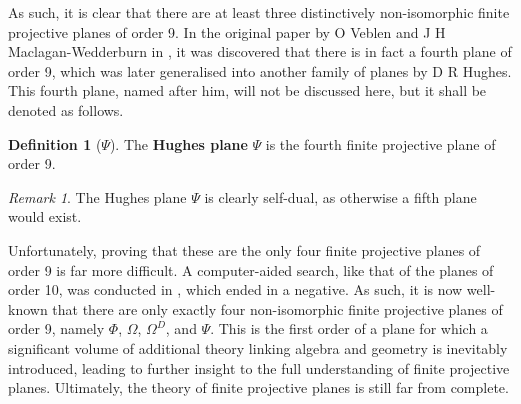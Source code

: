\documentclass{report}
\theoremstyle{definition}\newtheorem*{definition}{Definition}
\theoremstyle{definition}\newtheorem*{example}{Example}
\theoremstyle{remark}\newtheorem*{remark}{Remark}
\begin{document}
As such, it is clear that there are at least three distinctively non-isomorphic finite projective planes of order 9. In the original paper by O Veblen and J H Maclagan-Wedderburn in \cite{7}, it was discovered that there is in fact a fourth plane of order 9, which was later generalised into another family of planes by D R Hughes. This fourth plane, named after him, will not be discussed here, but it shall be denoted as follows.

\begin{definition}[$ \Psi $]
The \textbf{Hughes plane} $ \Psi $ is the fourth finite projective plane of order 9.
\end{definition}

\begin{remark}
The Hughes plane $ \Psi $ is clearly self-dual, as otherwise a fifth plane would exist.
\end{remark}

Unfortunately, proving that these are the only four finite projective planes of order 9 is far more difficult. A computer-aided search, like that of the planes of order 10, was conducted in \cite{computersearch}, which ended in a negative. As such, it is now well-known that there are only exactly four non-isomorphic finite projective planes of order 9, namely $ \Phi $, $ \Omega $, $ \Omega^D $, and $ \Psi $. This is the first order of a plane for which a significant volume of additional theory linking algebra and geometry is inevitably introduced, leading to further insight to the full understanding of finite projective planes. Ultimately, the theory of finite projective planes is still far from complete.

\printbibliography[heading=bibintoc]

\nocite{*}
\end{document}
